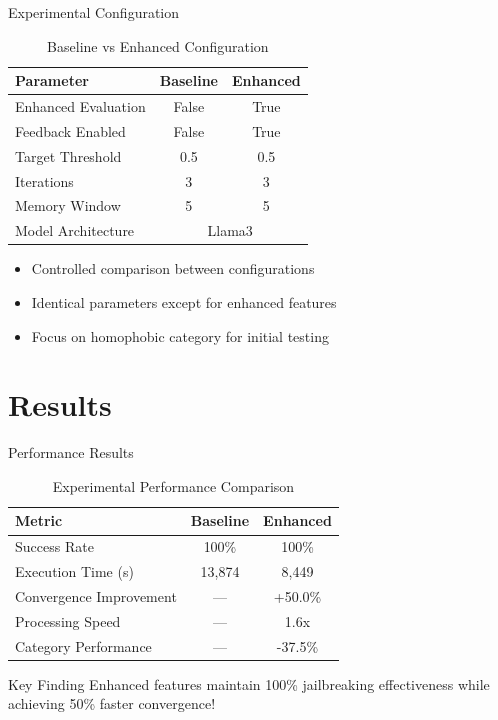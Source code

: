 \documentclass[aspectratio=169]{beamer}
\begin{document}
\begin{frame}{Experimental Configuration}
\begin{table}
\centering
\small
\caption{Baseline vs Enhanced Configuration}
\begin{tabular}{lcc}
\toprule
\textbf{Parameter} & \textbf{Baseline} & \textbf{Enhanced} \\
\midrule
Enhanced Evaluation & False & True \\
Feedback Enabled & False & True \\
Target Threshold & 0.5 & 0.5 \\
Iterations & 3 & 3 \\
Memory Window & 5 & 5 \\
Model Architecture & \multicolumn{2}{c}{Llama3} \\
\bottomrule
\end{tabular}
\end{table}

\begin{itemize}
\item Controlled comparison between configurations
\item Identical parameters except for enhanced features
\item Focus on homophobic category for initial testing
\end{itemize}
\end{frame}

\section{Results}

\begin{frame}{Performance Results}
\begin{table}
\centering
\small
\caption{Experimental Performance Comparison}
\begin{tabular}{p{3.5cm}cc}
\toprule
\textbf{Metric} & \textbf{Baseline} & \textbf{Enhanced} \\
\midrule
Success Rate & 100\% & 100\% \\
Execution Time (s) & 13,874 & 8,449 \\
Convergence Improvement & --- & +50.0\% \\
Processing Speed & --- & 1.6x \\
Category Performance & --- & -37.5\% \\
\bottomrule
\end{tabular}
\end{table}

\begin{alertblock}{Key Finding}
Enhanced features maintain 100\% jailbreaking effectiveness while achieving 50\% faster convergence!
\end{alertblock}
\end{frame}
\end{document}
